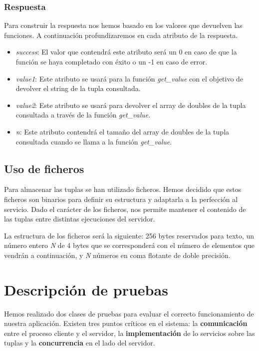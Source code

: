 \documentclass[]{article}
\begin{document}
\subsubsection{Respuesta}
\label{subsec::respuesta}
Para construir la respuesta nos hemos basado en los valores que devuelven las funciones. A continuación profundizaremos en cada atributo de la respuesta.

\begin{itemize}
  \item \textit{success}: El valor que contendrá este atributo será un 0 en caso de que la función se haya completado con éxito o un -1 en caso de error.
  \item \textit{value1}: Este atributo se usará para la función \textit{get\_value} con el objetivo de devolver el string de la tupla consultada.
  \item \textit{value2}: Este atributo se usará para devolver el array de doubles de la tupla consultada a través de la función \textit{get\_value}.
  \item \textit{n}: Este atributo contendrá el tamaño del array de doubles de la tupla consultada cuando se llama a la función \textit{get\_value}.
\end{itemize}

\subsection{Uso de ficheros}
\label{subsec:uso_de_ficheros}
Para almacenar las tuplas se han utilizado ficheros. Hemos decidido que estos ficheros son binarios para definir su estructura y adaptarla a la perfección al servicio.
Dado el carácter de los ficheros, nos permite mantener el contenido de las tuplas entre distintas ejecuciones del servidor. 

La estructura de los ficheros será la siguiente: 256 bytes reservados para texto, un número entero \textit{N} de 4 bytes que se corresponderá con el número de elementos que vendrán a continuación, y \textit{N} números en coma flotante de doble precisión. 


\section{Descripción de pruebas}
\label{sec:descripcion_de_pruebas}
Hemos realizado dos clases de pruebas para evaluar el correcto funcionamiento de nuestra aplicación. Existen tres puntos críticos en el sistema: la \textbf{comunicación} entre el proceso cliente y el servidor, la \textbf{implementación} de lo servicios sobre las tuplas y la \textbf{concurrencia} en el lado del servidor.  
\end{document}
